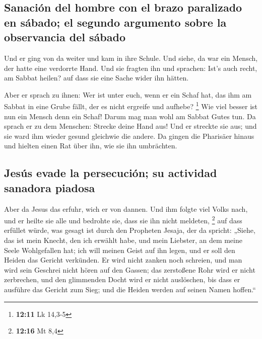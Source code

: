 \hypertarget{sanaciuxf3n-del-hombre-con-el-brazo-paralizado-en-suxe1bado-el-segundo-argumento-sobre-la-observancia-del-suxe1bado}{%
\subsection{Sanación del hombre con el brazo paralizado en sábado; el
segundo argumento sobre la observancia del
sábado}\label{sanaciuxf3n-del-hombre-con-el-brazo-paralizado-en-suxe1bado-el-segundo-argumento-sobre-la-observancia-del-suxe1bado}}

 Und er ging von da weiter und kam in ihre Schule.
 Und siehe, da war ein Mensch, der hatte eine verdorrte
Hand. Und sie fragten ihn und sprachen: Ist's auch recht, am Sabbat
heilen? auf dass sie eine Sache wider ihn hätten.

 Aber er sprach zu ihnen: Wer ist unter euch, wenn er ein
Schaf hat, das ihm am Sabbat in eine Grube fällt, der es nicht ergreife
und aufhebe? \footnote{\textbf{12:11} Lk 14,3-5}  Wie
viel besser ist nun ein Mensch denn ein Schaf! Darum mag man wohl am
Sabbat Gutes tun.  Da sprach er zu dem Menschen: Strecke
deine Hand aus! Und er streckte sie aus; und sie ward ihm wieder gesund
gleichwie die andere.  Da gingen die Pharisäer hinaus und
hielten einen Rat über ihn, wie sie ihn umbrächten.

\hypertarget{jesuxfas-evade-la-persecuciuxf3n-su-actividad-sanadora-piadosa}{%
\subsection{Jesús evade la persecución; su actividad sanadora
piadosa}\label{jesuxfas-evade-la-persecuciuxf3n-su-actividad-sanadora-piadosa}}

 Aber da Jesus das erfuhr, wich er von dannen. Und ihm
folgte viel Volks nach, und er heilte sie alle  und
bedrohte sie, dass sie ihn nicht meldeten, \footnote{\textbf{12:16} Mt
  8,4}  auf dass erfüllet würde, was gesagt ist durch den
Propheten Jesaja, der da spricht:  „Siehe, das ist mein
Knecht, den ich erwählt habe, und mein Liebster, an dem meine Seele
Wohlgefallen hat; ich will meinen Geist auf ihn legen, und er soll den
Heiden das Gericht verkünden.  Er wird nicht zanken noch
schreien, und man wird sein Geschrei nicht hören auf den Gassen;
 das zerstoßene Rohr wird er nicht zerbrechen, und den
glimmenden Docht wird er nicht auslöschen, bis dass er ausführe das
Gericht zum Sieg;  und die Heiden werden auf seinen Namen
hoffen.``

